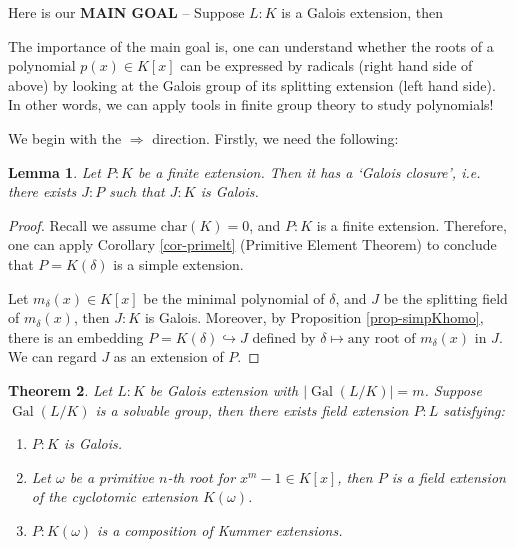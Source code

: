 \documentclass[11pt]{book}
\newtheorem{theorem}{Theorem}[section]
\newtheorem{lemma}[theorem]{Lemma}
\begin{document}
Here is our {\bf MAIN GOAL} --  Suppose $L:K$ is a Galois extension, then
\begin{center}
\end{center}
The importance of the main goal is, one can understand whether the roots of a polynomial $p(x) \in K[x]$ can be expressed by radicals (right hand side of above) by looking at the Galois group of its splitting extension (left hand side). In other words, we can apply tools in finite group theory to study polynomials!

\medskip
We begin with the $\Rightarrow$ direction. Firstly, we need the following:
\begin{lemma} \label{lem-galclosure}
    Let $P: K$ be a finite extension. Then it has a `Galois closure', i.e. there exists $J: P$ such that $J: K$ is Galois.
\end{lemma}
\begin{proof}
    Recall we assume $\mathrm{char}(K) = 0$, and $P: K$ is a finite extension. Therefore, one can apply Corollary \ref{cor-primelt} (Primitive Element Theorem) to conclude that $P = K(\delta)$ is a simple extension. 

    \smallskip
    Let $m_{\delta}(x) \in K[x]$ be the minimal polynomial of $\delta$, and $J$ be the splitting field of $m_{\delta}(x)$, then $J: K$ is Galois. Moreover, by Proposition \ref{prop-simpKhomo}, there is an embedding $P = K(\delta) \hookrightarrow J$ defined by $\delta \mapsto \text{any root of } m_{\delta}(x) \text{ in } J$. We can regard $J$ as an extension of $P$.
\end{proof}

\begin{theorem} \label{thm-radleft}
    Let $L :K$ be Galois extension with $\left| \operatorname{Gal}(L/K) \right| =m$. Suppose $\operatorname{Gal}(L /K)$ is a solvable group, then there exists field extension $P:L$ satisfying: 
    \begin{enumerate}
        \item $P:K$ is Galois. 
        \item Let $\omega$ be a primitive $n$-th root for $x^{m}-1\in K[x]$, then $P$ is a field extension of the cyclotomic extension $K(\omega)$. 
        \item $P:K(\omega)$ is a composition of Kummer extensions. 
    \end{enumerate}
\end{theorem}
\end{document}
